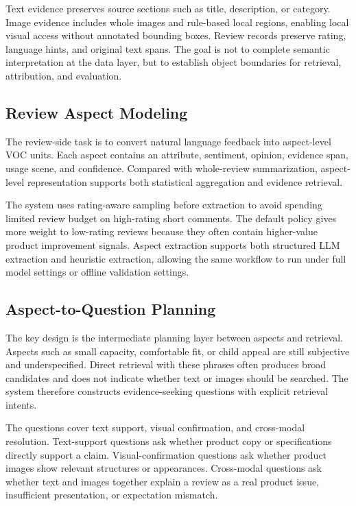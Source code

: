 \documentclass[11pt]{article}
\begin{document}
Text evidence preserves source sections such as title, description, or category. Image evidence includes whole images and rule-based local regions, enabling local visual access without annotated bounding boxes. Review records preserve rating, language hints, and original text spans. The goal is not to complete semantic interpretation at the data layer, but to establish object boundaries for retrieval, attribution, and evaluation.

\subsection{Review Aspect Modeling}

The review-side task is to convert natural language feedback into aspect-level VOC units. Each aspect contains an attribute, sentiment, opinion, evidence span, usage scene, and confidence. Compared with whole-review summarization, aspect-level representation supports both statistical aggregation and evidence retrieval.

The system uses rating-aware sampling before extraction to avoid spending limited review budget on high-rating short comments. The default policy gives more weight to low-rating reviews because they often contain higher-value product improvement signals. Aspect extraction supports both structured LLM extraction and heuristic extraction, allowing the same workflow to run under full model settings or offline validation settings.

\subsection{Aspect-to-Question Planning}

The key design is the intermediate planning layer between aspects and retrieval. Aspects such as small capacity, comfortable fit, or child appeal are still subjective and underspecified. Direct retrieval with these phrases often produces broad candidates and does not indicate whether text or images should be searched. The system therefore constructs evidence-seeking questions with explicit retrieval intents.

The questions cover text support, visual confirmation, and cross-modal resolution. Text-support questions ask whether product copy or specifications directly support a claim. Visual-confirmation questions ask whether product images show relevant structures or appearances. Cross-modal questions ask whether text and images together explain a review as a real product issue, insufficient presentation, or expectation mismatch.
\end{document}
